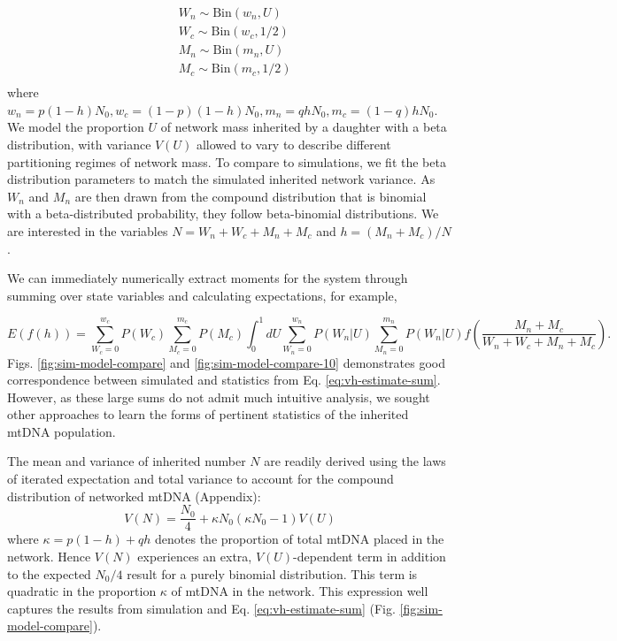 \documentclass{article}
\begin{document}
\begin{equation}\label{eq:model}
    \begin{split}
        & W_n \sim \mathrm{Bin}\left(w_n,U\right) \\
        & W_c \sim \mathrm{Bin}\left(w_c,1/2\right)\\ %
        & M_n \sim \mathrm{Bin}\left(m_n,U\right) \\
        & M_c \sim \mathrm{Bin}\left(m_c,1/2\right)\\ %
    \end{split}
\end{equation}
where $w_n = p(1-h)N_0, w_c = (1-p)(1-h)N_0, m_n = qhN_0, m_c = (1-q)hN_0$. We model the proportion $U$ of network mass inherited by a daughter with a beta distribution, with variance $V(U)$ allowed to vary to describe different partitioning regimes of network mass. To compare to simulations, we fit the beta distribution parameters to match the simulated inherited network variance. As $W_n$ and $M_n$ are then drawn from the compound distribution that is binomial with a beta-distributed probability, they follow beta-binomial distributions. We are interested in the variables $N = W_n+W_c+M_n+M_c$ and $h = (M_n+M_c)/N$.

We can immediately numerically extract moments for the system through summing over state variables and calculating expectations, for example, 

\begin{equation}\label{eq:vh-estimate-sum}
    E(f(h)) = \sum_{W_c = 0}^{w_c} P(W_c) \sum_{M_c = 0}^{m_c} P(M_c) \int_0^1 dU \sum_{W_n = 0}^{w_n} P(W_n|U) \sum_{M_n = 0}^{m_n} P(W_n|U) f\left(\frac{M_n+M_c}{W_n+W_c+M_n+M_c}\right).
\end{equation}
Figs. \ref{fig:sim-model-compare} and \ref{fig:sim-model-compare-10} demonstrates good correspondence between simulated and statistics from Eq. \ref{eq:vh-estimate-sum}. However, as these large sums do not admit much intuitive analysis, we sought other approaches to learn the forms of pertinent statistics of the inherited mtDNA population.

The mean and variance of inherited number $N$ are readily derived using the laws of iterated expectation and total variance to account for the compound distribution of networked mtDNA (Appendix):
\begin{equation}
    V(N)=\frac{N_0}{4}+\kappa N_0(\kappa N_0-1)V(U)
\end{equation}
where $\kappa = p(1-h)+qh$ denotes the proportion of total mtDNA placed in the network. Hence $V(N)$ experiences an extra, $V(U)$-dependent term in addition to the expected $N_0/4$ result for a purely binomial distribution. This term is quadratic in the proportion $\kappa$ of mtDNA in the network. This expression well captures the results from simulation and Eq. \ref{eq:vh-estimate-sum} (Fig. \ref{fig:sim-model-compare}).
\end{document}
